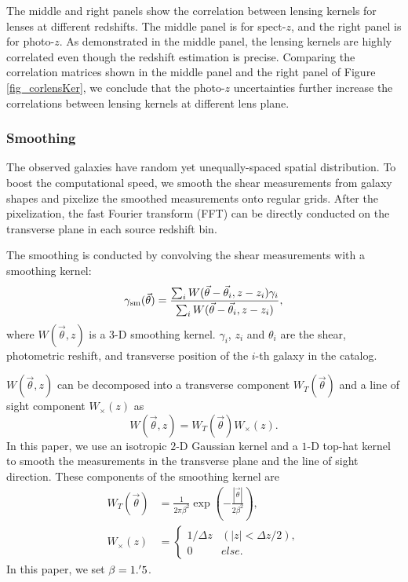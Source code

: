 \documentclass[twocolumn]{aastex62}
\begin{document}
The middle and right panels show the correlation between lensing kernels for
lenses at different redshifts. The middle panel is for spect-$z$, and the right
panel is for photo-$z$.  As demonstrated in the middle panel, the lensing
kernels are highly correlated even though the redshift estimation is precise.
Comparing the correlation matrices shown in the middle panel and the right
panel of Figure \ref{fig_corlensKer}, we conclude that the photo-$z$
uncertainties further increase the correlations between lensing kernels at
different lens plane.

\subsubsection{Smoothing}
\label{subsec_method_smoothing}

The observed galaxies have random yet unequally-spaced spatial distribution. To
boost the computational speed, we smooth the shear measurements from galaxy
shapes and pixelize the smoothed measurements onto regular grids.  After the
pixelization, the fast Fourier transform (FFT) can be directly conducted on the
transverse plane in each source redshift bin.

The smoothing is conducted by convolving the shear measurements with a
smoothing kernel:
\begin{equation}
\gamma_{\rm{sm}} (\vec{\theta})  = \frac{\sum_i
W(\vec{\theta}-\vec{{\theta}}_i,z-z_i) \gamma_i}{\sum_i
W(\vec{\theta}-\vec{{\theta}}_i,z-z_i) },
\end{equation}
where $W(\vec{\theta},z)$ is a $3$-D smoothing kernel. $\gamma_i$, $z_i$ and
$\theta_i$ are the shear, photometric reshift, and transverse position of the
$i$-th galaxy in the catalog.

$W(\vec{\theta},z)$ can be decomposed into a transverse component
$W_T(\vec{\theta})$ and a line of sight component
$W_\times(z)$ as
\begin{equation}
W(\vec{\theta},z)=W_T(\vec{\theta}) W_\times (z).
\end{equation}
In this paper, we use an isotropic $2$-D Gaussian kernel and a $1$-D top-hat
kernel to smooth the measurements in the transverse plane and the line of sight
direction. These components of the smoothing kernel are
\begin{equation}
\begin{split}
W_T(\vec{\theta}) &=\frac{1}{2\pi\beta^2}\exp(-\frac{|\vec{\theta}|}{2\beta^2}),\\
W_\times (z) &=
\begin{cases}
1/\Delta z& (|z|<\Delta z/2),\\
0& else.
\end{cases}
\end{split}
\end{equation}
In this paper, we set $\beta=1.\mbox{$^\prime$}5$.
\end{document}
